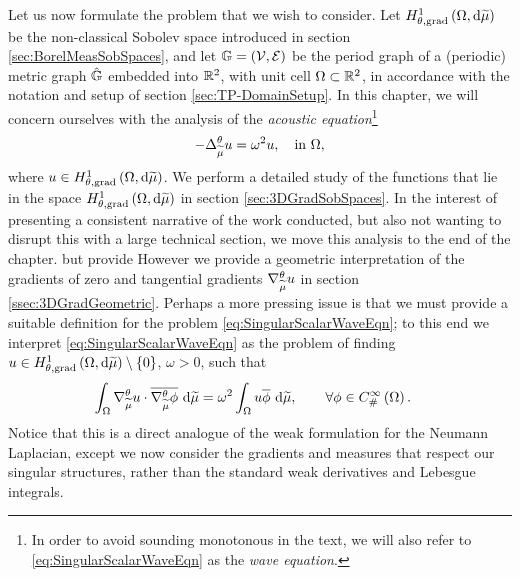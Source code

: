 Let us now formulate the problem that we wish to consider.
Let $H^1_{\theta, \mathrm{grad}}\left( \Omega, \mathrm{d}\widetilde{\mu} \right)$ be the non-classical Sobolev space introduced in section \ref{sec:BorelMeasSobSpaces}, and let $\mathbb{G}=\left( \mathcal{V}, \mathcal{E} \right)$ be the period graph of a (periodic) metric graph $\hat{\mathbb{G}}$ embedded into $\mathbb{R}^2$, with unit cell $\Omega\subset\mathbb{R}^2$, in accordance with the notation and setup of section \ref{sec:TP-DomainSetup}.
In this chapter, we will concern ourselves with the analysis of the \emph{acoustic equation}\footnote{In order to avoid sounding monotonous in the text, we will also refer to \eqref{eq:SingularScalarWaveEqn} as the \emph{wave equation}.}
\begin{align} \label{eq:SingularScalarWaveEqn}
	-\Delta_{\widetilde{\mu}}^{\theta} u = \omega^2 u, \quad\text{in } \Omega,
\end{align}
where $u\in H^1_{\theta, \mathrm{grad}}\left( \Omega, \mathrm{d}\widetilde{\mu} \right)$.
We perform a detailed study of the functions that lie in the space $H^1_{\theta, \mathrm{grad}}\left( \Omega, \mathrm{d}\widetilde{\mu} \right)$ in section \ref{sec:3DGradSobSpaces}.
In the interest of presenting a consistent narrative of the work conducted, but also not wanting to disrupt this with a large technical section, we move this analysis to the end of the chapter. but provide However we provide a geometric interpretation of the gradients of zero and tangential gradients $\nabla^{\theta}_{\widetilde{\mu}}u$ in section \ref{ssec:3DGradGeometric}.
Perhaps a more pressing issue is that we must provide a suitable definition for the problem \eqref{eq:SingularScalarWaveEqn}; to this end we interpret \eqref{eq:SingularScalarWaveEqn} as the problem of finding $u\in H^1_{\theta, \mathrm{grad}}\left( \Omega, \mathrm{d}\widetilde{\mu} \right)\setminus\left\{ 0 \right\}$, $\omega>0$, such that
\begin{align} \label{eq:SingularScalarWaveEqn-VariationalForm}
	\int_{\Omega} \nabla^{\theta}_{\widetilde{\mu}}u\cdot\overline{\nabla^{\theta}_{\widetilde{\mu}}\phi}  \ \mathrm{d}\widetilde{\mu}
	&= \omega^2 \int_{\Omega} u\overline{\phi}  \ \mathrm{d}\widetilde{\mu},
	\qquad\forall\phi\in C^{\infty}_{\#}\left( \Omega \right).
\end{align}
Notice that this is a direct analogue of the weak formulation for the Neumann Laplacian, except we now consider the gradients and measures that respect our singular structures, rather than the standard weak derivatives and Lebesgue integrals.

